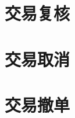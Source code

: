 
\section{交易复核} 
\label{sec:trade_manage_check}


\section{交易取消} 
\label{sec:trade_manage_drop}


\section{交易撤单} 
\label{sec:trade_manage_cancel}

